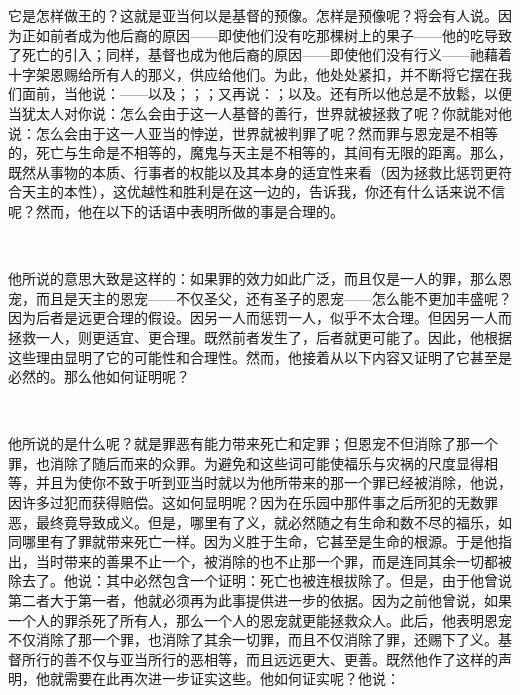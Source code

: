 它是怎样做王的？这就是亚当何以是基督的预像。怎样是预像呢？将会有人说。因为正如前者成为他后裔的原因——即使他们没有吃那棵树上的果子——他的吃导致了死亡的引入；同样，基督也成为他后裔的原因——即使他们没有行义——祂藉着十字架恩赐给所有人的那义，供应给他们。为此，他处处紧扣，并不断将它摆在我们面前，当他说：——以及；；；又再说：；以及。还有所以他总是不放鬆，以便当犹太人对你说：怎么会由于这一人基督的善行，世界就被拯救了呢？你就能对他说：怎么会由于这一人亚当的悖逆，世界就被判罪了呢？然而罪与恩宠是不相等的，死亡与生命是不相等的，魔鬼与天主是不相等的，其间有无限的距离。那么，既然从事物的本质、行事者的权能以及其本身的适宜性来看（因为拯救比惩罚更符合天主的本性），这优越性和胜利是在这一边的，告诉我，你还有什么话来说不信呢？然而，他在以下的话语中表明所做的事是合理的。\par

　\par

他所说的意思大致是这样的：如果罪的效力如此广泛，而且仅是一人的罪，那么恩宠，而且是天主的恩宠——不仅圣父，还有圣子的恩宠——怎么能不更加丰盛呢？因为后者是远更合理的假设。因另一人而惩罚一人，似乎不太合理。但因另一人而拯救一人，则更适宜、更合理。既然前者发生了，后者就更可能了。因此，他根据这些理由显明了它的可能性和合理性。然而，他接着从以下内容又证明了它甚至是必然的。那么他如何证明呢？\par

　\par

他所说的是什么呢？就是罪恶有能力带来死亡和定罪；但恩宠不但消除了那一个罪，也消除了随后而来的众罪。为避免和这些词可能使福乐与灾祸的尺度显得相等，并且为使你不致于听到亚当时就以为他所带来的那一个罪已经被消除，他说，因许多过犯而获得赔偿。这如何显明呢？因为在乐园中那件事之后所犯的无数罪恶，最终竟导致成义。但是，哪里有了义，就必然随之有生命和数不尽的福乐，如同哪里有了罪就带来死亡一样。因为义胜于生命，它甚至是生命的根源。于是他指出，当时带来的善果不止一个，被消除的也不止那一个罪，而是连同其余一切都被除去了。他说：其中必然包含一个证明：死亡也被连根拔除了。但是，由于他曾说第二者大于第一者，他就必须再为此事提供进一步的依据。因为之前他曾说，如果一个人的罪杀死了所有人，那么一个人的恩宠就更能拯救众人。此后，他表明恩宠不仅消除了那一个罪，也消除了其余一切罪，而且不仅消除了罪，还赐下了义。基督所行的善不仅与亚当所行的恶相等，而且远远更大、更善。既然他作了这样的声明，他就需要在此再次进一步证实这些。他如何证实呢？他说：\par

